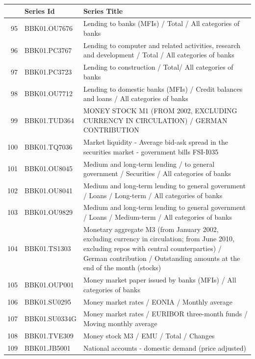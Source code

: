 \documentclass[12pt]{article}
\begin{document}
\begin{table}
\centering
\begin{tabular}{rp{5cm}p{11cm}}
& \textbf{Series Id} & \textbf{Series Title} \\
  \hline
  \hline
  95 & BBK01.OU7676 & Lending to banks (MFIs) / Total / All categories of banks \\ 
  \hline
  96 & BBK01.PC3767 & Lending to computer and related activities, research and development / Total / All categories of banks \\ 
  \hline
  97 & BBK01.PC3723 & Lending to construction / Total/ All categories of banks \\ 
  \hline
  98 & BBK01.OU7712 & Lending to domestic banks (MFIs) / Credit balances and loans / All categories of banks \\ 
  \hline
  99 & BBK01.TUD364 & MONEY STOCK M1 (FROM 2002, EXCLUDING CURRENCY IN CIRCULATION) / GERMAN CONTRIBUTION \\ 
  \hline
  100 & BBK01.TQ7036 & Market liquidity - Average bid-ask spread in the securities market - government bills                          FSI-I035 \\ 
  \hline
  101 & BBK01.OU8045 & Medium and long-term lending / to general government / Securities / All categories of banks \\ 
  \hline
  102 & BBK01.OU8041 & Medium and long-term lending to general government / Loans / Long-term / All categories of banks \\ 
  \hline
  103 & BBK01.OU9829 & Medium and long-term lending to general government / Loans / Medium-term / All categories of banks \\ 
  \hline
  104 & BBK01.TS1303 & Monetary aggregate M3 (from January 2002, excluding currency in circulation; from June 2010, excluding repos with central counterparties) / German contribution / Outstanding amounts at the end of the month (stocks) \\ 
  \hline
  105 & BBK01.OUP001 & Money market paper issued by banks (MFIs) / All categories of banks \\ 
  \hline
  106 & BBK01.SU0295 & Money market rates / EONIA / Monthly average \\ 
  \hline
  107 & BBK01.SU0334G & Money market rates / EURIBOR three-month funds / Moving monthly average \\ 
  \hline
  108 & BBK01.TVE309 & Money stock M3 / EMU / Total / Changes \\ 
  \hline
  109 & BBK01.JB5001 & National accounts - domestic demand (price adjusted) \\ 

\end{tabular}
\end{table}
\end{document}
